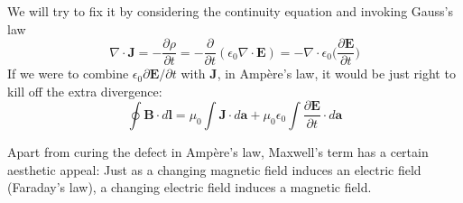 \documentclass[../../../main.tex]{subfiles}
\begin{document}
We will try to fix it by considering the continuity equation and  invoking Gauss's law
\begin{equation*}
    \nabla\cdot\mathbf{J}=-\frac{\partial \rho}{\partial t}=-\frac{\partial }{\partial t}(\epsilon_0 \nabla\cdot \mathbf{E})=-\nabla\cdot\epsilon_0\biggl(\frac{\partial \mathbf{E}}{\partial t}\biggr)
\end{equation*}
If we were to combine $\epsilon_0 \partial \mathbf{E}/\partial t$ with \textbf{J}, in Ampère’s law, it would be just right to kill off the extra divergence:
\begin{equation*}
    \oint \mathbf{B}\cdot d\mathbf{l} =\mu_0\int\mathbf{J}\cdot d\mathbf{a}+ \mu_0\epsilon_0 \int\frac{\partial \mathbf{E}}{\partial t}\cdot d\mathbf{a}
\end{equation*}

Apart from curing the defect in Ampère’s law, Maxwell’s term has a certain aesthetic appeal: Just as a changing magnetic ﬁeld induces an electric ﬁeld (Faraday’s law), a changing electric ﬁeld induces a magnetic ﬁeld.
\end{document}

